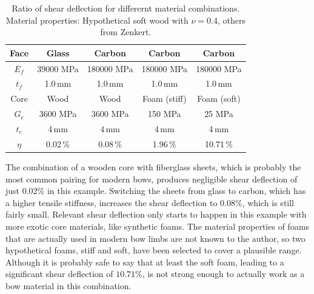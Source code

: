 \begin{table}[h!]
\centering
\begin{tabular}{| c | c c c c |}
\hline
Face & Glass & Carbon & Carbon & Carbon \\
\hline
$E_f$ & 39000 MPa & 180000 MPa & 180000 MPa & 180000 MPa \\
$t_f$ & 1.0\,\unit{mm} & 1.0\,\unit{mm} & 1.0\,\unit{mm} & 1.0\,\unit{mm} \\
\hline
Core & Wood & Wood & Foam (stiff) & Foam (soft) \\
\hline
$G_c$ & 3600 MPa & 3600 MPa & 150 MPa & 25 MPa \\
$t_c$ & 4\,\unit{mm} & 4\,\unit{mm} & 4\,\unit{mm} & 4\,\unit{mm} \\
\hline
$\eta$ & 0.02\,\% & 0.08\,\% & 1.96\,\% & 10.71\,\% \\
\hline
\end{tabular}
\caption{Ratio of shear deflection for differernt material combinations. Material properties: Hypothetical soft wood with $\nu = 0.4$, others from Zenkert.}
\label{tbl:material-shear-ratio}
\end{table}

%
%
%
%
%
%
%

The combination of a wooden core with fiberglass sheets, which is probably the most common pairing for modern bows, produces negligible shear deflection of just $0.02\%$ in this example.
Switching the sheets from glass to carbon, which has a higher tensile stiffness, increases the shear deflection to $0.08\%$, which is still fairly small.
Relevant shear deflection only starts to happen in this example with more exotic core materials, like synthetic foams.
The material properties of foams that are actually used in modern bow limbs are not known to the author, so two hypothetical foams, stiff and soft, have been selected to cover a plausible range.
Although it is probably safe to say that at least the soft foam, leading to a significant shear deflection of $10.71\%$, is not strong enough to actually work as a bow material in this combination.

